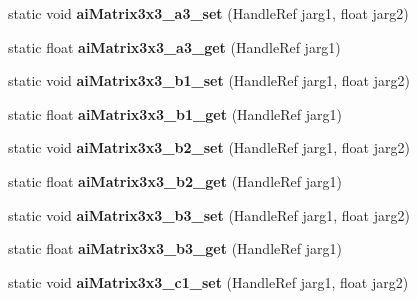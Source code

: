 \begin{DoxyCompactItemize}
\item 
\hypertarget{class_assimp_p_i_n_v_o_k_e_a3d25e3a591a6658b63caef534afe4f87}{static void {\bfseries ai\+Matrix3x3\+\_\+a3\+\_\+set} (Handle\+Ref jarg1, float jarg2)}\label{class_assimp_p_i_n_v_o_k_e_a3d25e3a591a6658b63caef534afe4f87}

\item 
\hypertarget{class_assimp_p_i_n_v_o_k_e_ab10f02f38e8734b3a7bb8060c4c7e34a}{static float {\bfseries ai\+Matrix3x3\+\_\+a3\+\_\+get} (Handle\+Ref jarg1)}\label{class_assimp_p_i_n_v_o_k_e_ab10f02f38e8734b3a7bb8060c4c7e34a}

\item 
\hypertarget{class_assimp_p_i_n_v_o_k_e_adcc60680ba3bf9b1bccbbe4a8d9fc019}{static void {\bfseries ai\+Matrix3x3\+\_\+b1\+\_\+set} (Handle\+Ref jarg1, float jarg2)}\label{class_assimp_p_i_n_v_o_k_e_adcc60680ba3bf9b1bccbbe4a8d9fc019}

\item 
\hypertarget{class_assimp_p_i_n_v_o_k_e_ac311bb2463c9ce4b99f4af5f3726bebb}{static float {\bfseries ai\+Matrix3x3\+\_\+b1\+\_\+get} (Handle\+Ref jarg1)}\label{class_assimp_p_i_n_v_o_k_e_ac311bb2463c9ce4b99f4af5f3726bebb}

\item 
\hypertarget{class_assimp_p_i_n_v_o_k_e_a3e7848c9d83c65d6c83ea784c256207b}{static void {\bfseries ai\+Matrix3x3\+\_\+b2\+\_\+set} (Handle\+Ref jarg1, float jarg2)}\label{class_assimp_p_i_n_v_o_k_e_a3e7848c9d83c65d6c83ea784c256207b}

\item 
\hypertarget{class_assimp_p_i_n_v_o_k_e_ab3ca39748c935b532f987b5b760407ff}{static float {\bfseries ai\+Matrix3x3\+\_\+b2\+\_\+get} (Handle\+Ref jarg1)}\label{class_assimp_p_i_n_v_o_k_e_ab3ca39748c935b532f987b5b760407ff}

\item 
\hypertarget{class_assimp_p_i_n_v_o_k_e_acef7b7a7919fdfd99418671e2bfba00e}{static void {\bfseries ai\+Matrix3x3\+\_\+b3\+\_\+set} (Handle\+Ref jarg1, float jarg2)}\label{class_assimp_p_i_n_v_o_k_e_acef7b7a7919fdfd99418671e2bfba00e}

\item 
\hypertarget{class_assimp_p_i_n_v_o_k_e_a3a12bea5c1675b86ed10bdddf51ed8cd}{static float {\bfseries ai\+Matrix3x3\+\_\+b3\+\_\+get} (Handle\+Ref jarg1)}\label{class_assimp_p_i_n_v_o_k_e_a3a12bea5c1675b86ed10bdddf51ed8cd}

\item 
\hypertarget{class_assimp_p_i_n_v_o_k_e_a05889726ee01069c0796f55494d3285f}{static void {\bfseries ai\+Matrix3x3\+\_\+c1\+\_\+set} (Handle\+Ref jarg1, float jarg2)}\label{class_assimp_p_i_n_v_o_k_e_a05889726ee01069c0796f55494d3285f}


\end{DoxyCompactItemize}
